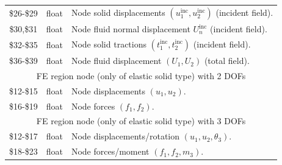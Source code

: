 \documentclass[a4paper,fleqn]{book}
\begin{document}
\begin{longtable}{ccp{11cm}}
\$26-\$29 & float & Node solid displacements $(u_1^\mathrm{inc},u_2^\mathrm{inc})$ (incident field). \\
\$30,\$31 & float & Node fluid normal displacement $U_n^\mathrm{inc}$ (incident field). \\
\$32-\$35 & float & Node solid tractions $(t_1^\mathrm{inc},t_2^\mathrm{inc})$ (incident field). \\
\$36-\$39 & float & Node fluid displacement $(U_1,U_2)$ (total field). \\
\midrule
\multicolumn{3}{c}{FE region node (only of elastic solid type) with 2 DOFs} \\
\$12-\$15 & float & Node displacements $(u_1,u_2)$. \\
\$16-\$19 & float & Node forces $(f_1,f_2)$. \\
\midrule
\multicolumn{3}{c}{FE region node (only of elastic solid type) with 3 DOFs} \\
\$12-\$17 & float & Node displacements/rotation $(u_1,u_2,\theta_3)$. \\
\$18-\$23 & float & Node forces/moment $(f_1,f_2,m_3)$. \\
\end{longtable}
\end{document}
